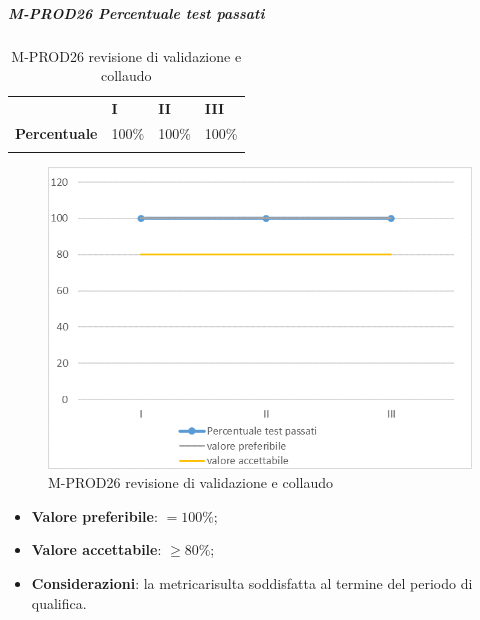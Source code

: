 \subparagraph{M-PROD26 Percentuale test passati} \mbox{}
\begin{longtable}[H!] {						
		>{}p{50mm}  		
		>{}p{8mm}
		>{}p{8mm}		
		>{}p{8mm}		
	}
	\rowcolor{gray!50}
	\textbf{} & \textbf{I} & \textbf{II} & \textbf{III}  \TBstrut \\ [2mm]
	\textbf{Percentuale} & 100\% & 100\% & 100\%  \TBstrut \\ [2mm]
	\rowcolor{white}
	\caption{M-PROD26 revisione di validazione e collaudo}
\end{longtable}
\begin{figure}[H] 	
	\includegraphics[width=\linewidth]{./img/grafici/RA26.png}	
	\caption{M-PROD26 revisione di validazione e collaudo}	
\end{figure}
\begin{itemize}
	\item \textbf{Valore preferibile}: $= 100\%$;
	\item \textbf{Valore accettabile}: $\ge 80\%$;
	\item \textbf{Considerazioni}: la metrica\glosp risulta soddisfatta al termine del periodo di qualifica.
\end{itemize}


